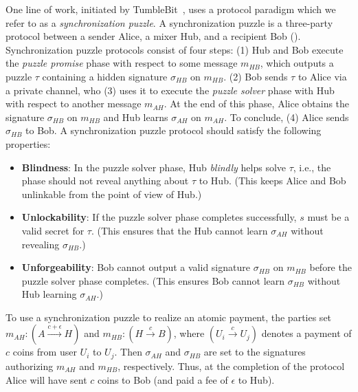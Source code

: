One line of work, initiated by TumbleBit~\cite{NDSS:HABSG17}, uses a protocol paradigm which we refer to as a \emph{synchronization puzzle}. A synchronization puzzle is a three-party protocol between a sender Alice, a mixer Hub, and a recipient Bob (). Synchronization puzzle protocols consist of four steps: (1) Hub and Bob execute the \emph{puzzle promise} phase with respect to some message $m_{HB}$, which outputs a puzzle $\tau$ containing a hidden signature $\sigma_{HB}$ on $m_{HB}$. (2) Bob sends $\tau$ to Alice via a private channel, who (3) uses it to execute the \emph{puzzle solver} phase with Hub with respect to another message $m_{AH}$. At the end of this phase, Alice obtains the signature $\sigma_{HB}$ on $m_{HB}$ and Hub learns $\sigma_{AH}$ on $m_{AH}$. To conclude, (4) Alice sends $\sigma_{HB}$ to Bob. A synchronization puzzle protocol should satisfy the following properties:
\begin{itemize}
    \item \textbf{Blindness}: In the puzzle solver phase, Hub \emph{blindly} helps solve $\tau$, i.e., the phase should not reveal anything about $\tau$ to Hub. (This keeps Alice and Bob unlinkable from the point of view of Hub.)
    \item \textbf{Unlockability}: If the puzzle solver phase completes successfully, $s$ must be a valid secret for $\tau$. (This ensures that the Hub cannot learn $\sigma_{AH}$ without revealing $\sigma_{HB}$.)
    \item \textbf{Unforgeability}: Bob cannot output a valid signature $\sigma_{HB}$ on $m_{HB}$ before the puzzle solver phase completes. (This ensures Bob cannot learn $\sigma_{HB}$ without Hub learning $\sigma_{AH}$.)
\end{itemize}
To use a synchronization puzzle to realize an atomic payment, the parties set $m_{AH} : (A \xrightarrow{c+\epsilon} H)$ and $m_{HB} : (H \xrightarrow{c} B)$, where $(U_i \xrightarrow{c} U_j)$ denotes a payment of $c$ coins from user $U_i$ to $U_j$. Then $\sigma_{AH}$ and $\sigma_{HB}$ are set to the signatures authorizing $m_{AH}$ and $m_{HB}$, respectively. Thus, at the completion of the protocol Alice will have sent $c$ coins to Bob (and paid a fee of $\epsilon$ to Hub).


